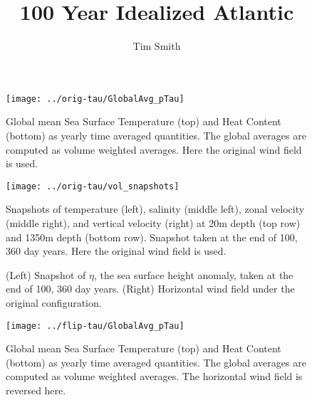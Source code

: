 \documentclass[a4paper,11pt]{article}
\title{\vspace{-10ex}100 Year Idealized Atlantic}
\author{Tim Smith}
\date{\vspace{-3ex}}
\begin{document}
 


\begin{figure}
\centering
\texttt{[image: ../orig-tau/GlobalAvg\_pTau]}
\caption{Global mean Sea Surface Temperature (top) and Heat Content (bottom) as yearly time averaged quantities. The global averages are computed as volume weighted averages. Here the original wind field is used. }
\label{fig:globalAvgs}
\end{figure}

\begin{figure}
\centering
\texttt{[image: ../orig-tau/vol\_snapshots]}
\caption{Snapshots of temperature (left), salinity (middle left), zonal velocity (middle right), and vertical velocity (right) at 20m depth (top row) and 1350m depth (bottom row). Snapshot taken at the end of 100, 360 day years. Here the original wind field is used.}
\label{fig:volSnaps}
\end{figure}

\begin{figure}
\centering
{}
\qquad
{}
\caption{(Left) Snapshot of $\eta$, the sea surface height anomaly, taken at the end of 100, 360 day years. (Right) Horizontal wind field under the original configuration. } 
\label{fig:etaSnap}
\end{figure}

%

\begin{figure}
\centering
\texttt{[image: ../flip-tau/GlobalAvg\_pTau]}
\caption{Global mean Sea Surface Temperature (top) and Heat Content (bottom) as yearly time averaged quantities. The global averages are computed as volume weighted averages. The horizontal wind field is reversed here.}
\label{fig:flipGlobalAvgs}
\end{figure}
\end{document}
